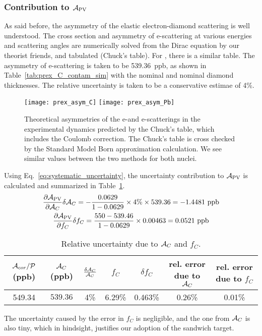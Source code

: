 \subsubsection{Contribution to $\mathcal{A}_{\text{PV}}$}
As said before, the asymmetry of the elastic electron-diamond scattering is well understood.
The cross section and asymmetry of e-\C scattering at various energies 
and scattering angles are numerically solved from the Dirac equation by our 
theorist friends, and tabulated (Chuck's table). For \Pb, there is a similar table.
The asymmetry of e-\C scattering is taken to be 539.36~ppb, as shown in 
Table~\ref{tab:prex_C_contam_sim}
with the nominal \Pb and nominal diamond thicknesses. The relative uncertainty is taken
to be a conservative estimae of 4\%.
\begin{figure}[!h]
    \centering
    \texttt{[image: prex\_asym\_C]}
    \texttt{[image: prex\_asym\_Pb]}
    \caption[Theoretical asymmetries of the e-\C and e-\Pb scattering]
    {Theoretical asymmetries of the e-\C and e-\Pb scatterings in the experimental 
    dynamics predicted by the Chuck's table, which includes the Coulomb correction. 
    The Chuck's table is cross checked by the Standard Model Born approximation 
    calculation. We see similar values between the two methods for both nuclei.}
    \label{fig:prex_asym}
\end{figure}

Using Eq.~\ref{eq:systematic_uncertainty}, the uncertainty contribution to $\mathcal{A}_{\text{PV}}$
is calculated and summarized in Table~\ref{tab:prex_C_contam}.
\begin{equation}
    \begin{gathered}
	\frac{\partial \mathcal{A}_{\text{PV}}}{\partial \mathcal{A}_C} \delta \mathcal{A}_C = 
	-\frac{0.0629}{1 - 0.0629} \times 4\% \times 539.36 = -1.4481\ \mathrm{ppb}   \\
	\frac{\partial \mathcal{A}_{\text{PV}}}{\partial f_C}\delta f_C =
	\frac{550 - 539.46}{1 - 0.0629} \times 0.00463 = 0.0521\ \mathrm{ppb}	\\
    \end{gathered}
\end{equation}

\begin{table}[!h]
    \centering
    \begin{tabular}{c | c c | c c | c c}
        \hline
	\thead{$\mathcal{A}_{cor}/\mathcal{P}$ \\ (ppb)}   & \thead{$\mathcal{A}_C$ \\ (ppb)}   & $\frac{\delta\mathcal{A}_C}{\mathcal{A}_C}$   & $f_C$ & $\delta f_C$  & \thead{rel. error \\ due to $\mathcal{A}_C$ } & \thead{rel. error \\ due to $f_C$}\\
        \hline
	549.34	& $539.36$  & 4\%   & 6.29\%	& 0.463\%   & 0.26\%	& 0.01\% \\
        \hline
    \end{tabular}
    \caption{Relative uncertainty due to $\mathcal{A}_C$ and $f_C$.}
    \label{tab:prex_C_contam}
\end{table}
The uncertainty caused by the error in $f_C$ is negligible, and the one from $\mathcal{A}_C$
is also tiny, which in hindsight, justifies our adoption of the sandwich target.

